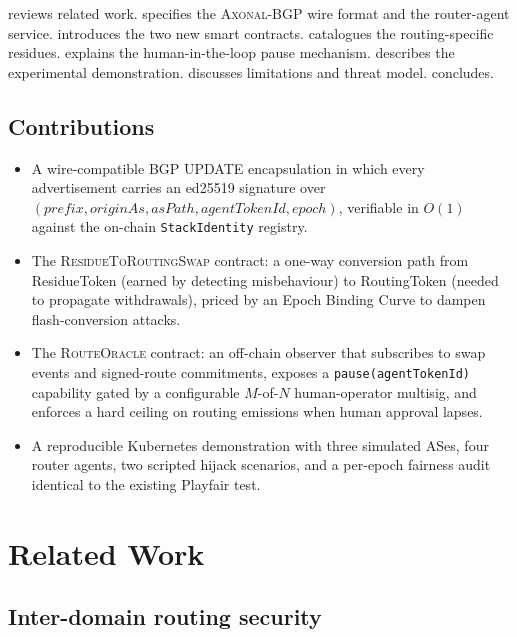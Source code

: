 \documentclass[11pt,twocolumn]{article}
\theoremstyle{definition}
\theoremstyle{plain}
\theoremstyle{remark}
\newcommand{\axonal}{\textsc{Axonal-BGP}}
\newcommand{\contractname}[1]{\textsc{#1}}
\newcommand{\code}[1]{\texttt{#1}}
\begin{document}
 reviews related work.  specifies the \axonal{} wire format and the router-agent service.  introduces the two new smart contracts.  catalogues the routing-specific residues.  explains the human-in-the-loop pause mechanism.  describes the experimental demonstration.  discusses limitations and threat model.  concludes.

\subsection{Contributions}

\begin{itemize}[leftmargin=*,itemsep=2pt]
  \item A wire-compatible BGP UPDATE encapsulation in which every advertisement carries an ed25519 signature over $(\mathit{prefix}, \mathit{originAs}, \mathit{asPath}, \mathit{agentTokenId}, \mathit{epoch})$, verifiable in $O(1)$ against the on-chain \code{StackIdentity} registry.
  \item The \contractname{ResidueToRoutingSwap} contract: a one-way conversion path from ResidueToken (earned by detecting misbehaviour) to RoutingToken (needed to propagate withdrawals), priced by an Epoch Binding Curve to dampen flash-conversion attacks.
  \item The \contractname{RouteOracle} contract: an off-chain observer that subscribes to swap events and signed-route commitments, exposes a \code{pause(agentTokenId)} capability gated by a configurable $M$-of-$N$ human-operator multisig, and enforces a hard ceiling on routing emissions when human approval lapses.
  \item A reproducible Kubernetes demonstration with three simulated ASes, four router agents, two scripted hijack scenarios, and a per-epoch fairness audit identical to the existing Playfair test.
\end{itemize}

\section{Related Work}\label{sec:related}

\subsection{Inter-domain routing security}
\end{document}
